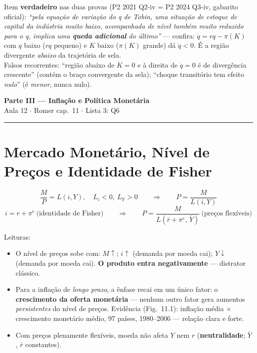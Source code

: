 \documentclass[12pt, a4paper]{article}
\begin{document}
\begin{provabox}[title={Como cai na prova}]
Item \textbf{verdadeiro} nas duas provas (P2 2021 Q2-iv = P2 2024 Q3-iv,
gabarito oficial): \emph{``pela equação de variação do q de Tobin, uma
situação de estoque de capital da indústria muito baixo, acompanhada de nível
também muito reduzido para o q, implica uma \textbf{queda adicional} do
último''} --- confira: $\dot q = rq - \pi(K)$ com $q$ baixo ($rq$ pequeno) e
$K$ baixo ($\pi(K)$ grande) dá $\dot q < 0$. É a região divergente
\emph{abaixo} da trajetória de sela.\\
Falsos recorrentes: ``região abaixo de $\dot K=0$ e à direita de $\dot q=0$ é
de divergência crescente'' (contém o braço convergente da sela); ``choque
transitório tem efeito \emph{nulo}'' (é \emph{menor}, nunca nulo).
\end{provabox}

\newpage
\begin{center}
{\LARGE\bfseries\color{orangerbc} Parte III --- Inflação e Política Monetária}\\[0.2em]
{\normalsize\color{grayrbc} Aula 12 $\cdot$ Romer cap.\ 11 $\cdot$ Lista 3: Q6}\\[0.2em]
\rule{\linewidth}{0.8pt}
\end{center}

\section{Mercado Monetário, Nível de Preços e Identidade de Fisher}

\begin{formulabox}[title={Equações-base (slides, eqs.\ 1--4)}]
\[
\frac{M}{P} = L(i, Y),\quad L_i<0,\ L_Y>0
\qquad\Longrightarrow\qquad
P = \frac{M}{L(i,Y)}
\]
\[
i = r + \pi^e \ \text{(identidade de Fisher)}
\qquad\Longrightarrow\qquad
P = \frac{M}{L(\bar r + \pi^e,\, \bar Y)} \ \text{(preços flexíveis)}
\]
\end{formulabox}

Leituras:
\begin{itemize}[leftmargin=1.4em]
\item O nível de preços sobe com: $M\uparrow$; $i\uparrow$ (demanda por moeda
cai); $Y\downarrow$ (demanda por moeda cai). \textbf{O produto entra
negativamente} --- distrator clássico.
\item Para a inflação de \emph{longo prazo}, a ênfase recai em um único fator:
o \textbf{crescimento da oferta monetária} --- nenhum outro fator gera
aumentos \emph{persistentes} do nível de preços. Evidência (Fig.\ 11.1):
inflação média $\times$ crescimento monetário médio, 97 países, 1980--2006 ---
relação clara e forte.
\item Com preços plenamente flexíveis, moeda não afeta $Y$ nem $r$
(\textbf{neutralidade}; $\bar Y$, $\bar r$ constantes).
\end{itemize}
\end{document}
